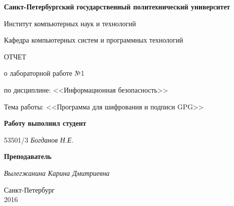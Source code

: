 \begin{titlepage}
\begin{center}

\textbf{Санкт-Петербургский государственный политехнический университет}

\vspace{5mm}
Институт компьютерных наук и технологий

\vspace{5mm}
Кафедра компьютерных систем и программных технологий

\vspace*{\fill}

\huge{ОТЧЕТ}

\Large{о лабораторной работе №1}
\vspace{2mm}

\large{по дисциплине: <<Информационная безопасность>>}

\vspace*{2mm}
\large{Тема работы: <<Программа для шифрования и подписи GPG>>}

\vspace*{\fill}
\end{center}

\begin{large}
\hspace{0.25\linewidth} \textbf{Работу выполнил студент}

\vspace{5mm}
\hspace{0.25\linewidth} 53501/3 \hspace{5mm} \textit{Богданов Н.Е.}

\vspace{3mm}
\hspace{0.25\linewidth} \textbf{Преподаватель}

\vspace{5mm}
\hspace{0.25\linewidth} \underline{\hspace{2cm} } \hspace{3mm} \textit{Вылегжанина Карина Дмитриевна}
\end{large}

\vspace*{3cm}

\begin{center}
\normalsize Санкт-Петербург\\2016
\end{center}
\end{titlepage}